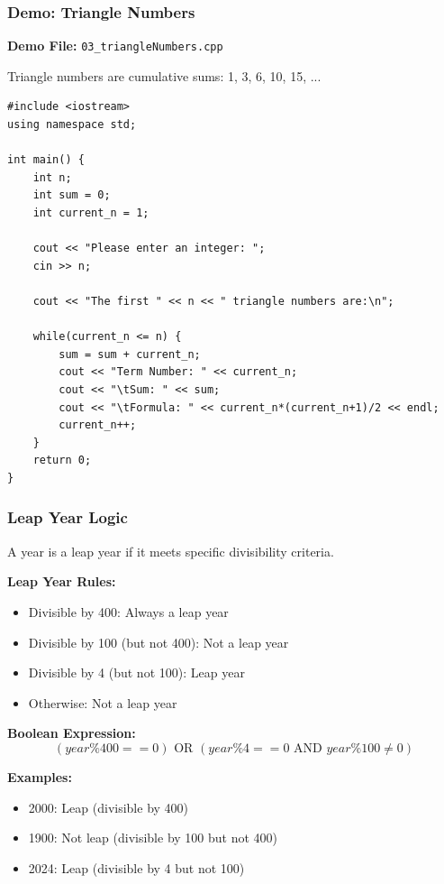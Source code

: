 \documentclass{beamer}
\begin{document}
\begin{frame}[fragile]
\frametitle{Demo: Triangle Numbers}
\textbf{Demo File:} \texttt{03\_triangleNumbers.cpp}

\pause
Triangle numbers are cumulative sums: 1, 3, 6, 10, 15, ...

\pause
\begin{verbatim}
#include <iostream>
using namespace std;

int main() {
    int n;
    int sum = 0;
    int current_n = 1;
    
    cout << "Please enter an integer: ";
    cin >> n;
    
    cout << "The first " << n << " triangle numbers are:\n";
    
    while(current_n <= n) {
        sum = sum + current_n;
        cout << "Term Number: " << current_n;
        cout << "\tSum: " << sum;
        cout << "\tFormula: " << current_n*(current_n+1)/2 << endl;
        current_n++;
    }
    return 0;
}
\end{verbatim}
\end{frame}

\begin{frame}
\frametitle{Leap Year Logic}
A year is a leap year if it meets specific divisibility criteria.

\pause
\textbf{Leap Year Rules:}
\begin{itemize}
\item Divisible by 400: Always a leap year
\pause
\item Divisible by 100 (but not 400): Not a leap year
\pause
\item Divisible by 4 (but not 100): Leap year
\pause
\item Otherwise: Not a leap year
\end{itemize}

\pause
\textbf{Boolean Expression:}
$$(year \% 400 == 0) \text{ OR } (year \% 4 == 0 \text{ AND } year \% 100 \neq 0)$$

\pause
\textbf{Examples:}
\begin{itemize}
\item 2000: Leap (divisible by 400)
\pause
\item 1900: Not leap (divisible by 100 but not 400)
\pause
\item 2024: Leap (divisible by 4 but not 100)
\end{itemize}
\end{frame}
\end{document}
